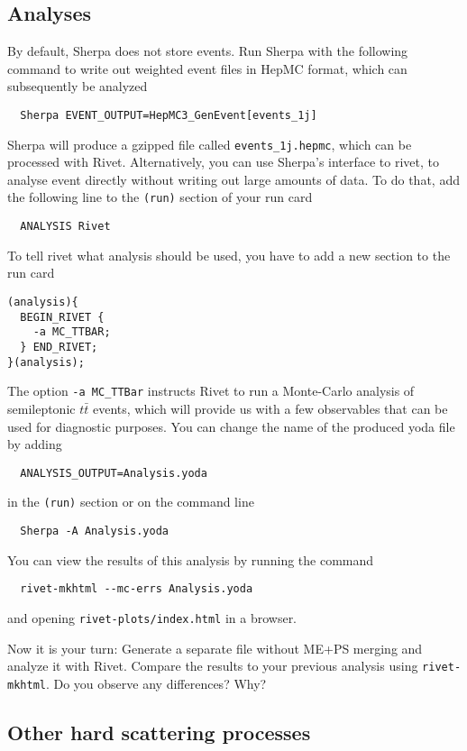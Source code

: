 \documentclass[10pt]{article}
\begin{document}
\subsection{Analyses}

By default, Sherpa does not store events. Run Sherpa with the following command 
to write out weighted event files in HepMC format, which can subsequently be analyzed
\begin{verbatim}
  Sherpa EVENT_OUTPUT=HepMC3_GenEvent[events_1j]
\end{verbatim}
Sherpa will produce a gzipped file called {\tt events\_1j.hepmc}, 
which can be processed with Rivet. Alternatively, you can use Sherpa's interface
to rivet, to analyse event directly without writing out large amounts of
data. To do that, add the following line to the {\tt (run)} section of your run
card
%
\begin{verbatim}
  ANALYSIS Rivet
\end{verbatim}
%
To tell rivet what analysis should be used, you have to add a new section to the
run card
\begin{verbatim}
(analysis){
  BEGIN_RIVET {
    -a MC_TTBAR;
  } END_RIVET;
}(analysis);
\end{verbatim}
The option {\tt -a MC\_TTBar} instructs Rivet to run a Monte-Carlo analysis 
of semileptonic $t\bar{t}$ events, which will provide us with a few observables
that can be used for diagnostic purposes.
%
You can change the name of the produced yoda file by adding
%
\begin{verbatim}
  ANALYSIS_OUTPUT=Analysis.yoda
\end{verbatim}
in the  {\tt (run)} section or on the command line
\begin{verbatim}
  Sherpa -A Analysis.yoda
\end{verbatim}
%
You can view the results of this analysis by running the command
\begin{verbatim}
  rivet-mkhtml --mc-errs Analysis.yoda
\end{verbatim}
and opening {\tt rivet-plots/index.html} in a browser.

Now it is your turn: Generate a separate file without ME+PS merging 
and analyze it with Rivet. Compare the results to your previous analysis 
using {\tt rivet-mkhtml}. Do you observe any differences? Why?

\subsection{Other hard scattering processes}
\end{document}
